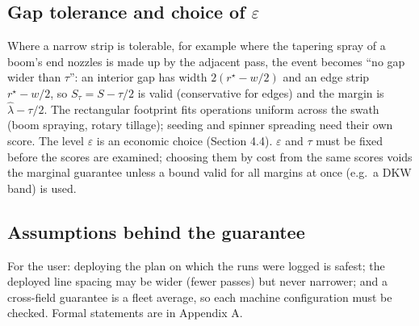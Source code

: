 \documentclass[preprint,12pt,authoryear]{elsarticle}
\begin{document}
\subsection{\texorpdfstring{Gap tolerance and choice of \(\varepsilon\)}{Gap tolerance and choice of \textbackslash varepsilon}}

Where a narrow strip is tolerable, for example where the tapering spray of a boom's end nozzles is made up by the adjacent pass, the event becomes ``no gap wider than \(\tau\)'': an interior gap has width \(2(r^\star-w/2)\) and an edge strip \(r^\star-w/2\), so \(S_\tau=S-\tau/2\) is valid (conservative for edges) and the margin is \(\hat\lambda-\tau/2\). The rectangular footprint fits operations uniform across the swath (boom spraying, rotary tillage); seeding and spinner spreading need their own score. The level \(\varepsilon\) is an economic choice (Section 4.4). \(\varepsilon\) and \(\tau\) must be fixed before the scores are examined; choosing them by cost from the same scores voids the marginal guarantee unless a bound valid for all margins at once (e.g.~a DKW band) is used.

\subsection{Assumptions behind the guarantee}

For the user: deploying the plan on which the runs were logged is safest; the deployed line spacing may be wider (fewer passes) but never narrower; and a cross-field guarantee is a fleet average, so each machine configuration must be checked. Formal statements are in Appendix A.
\end{document}
